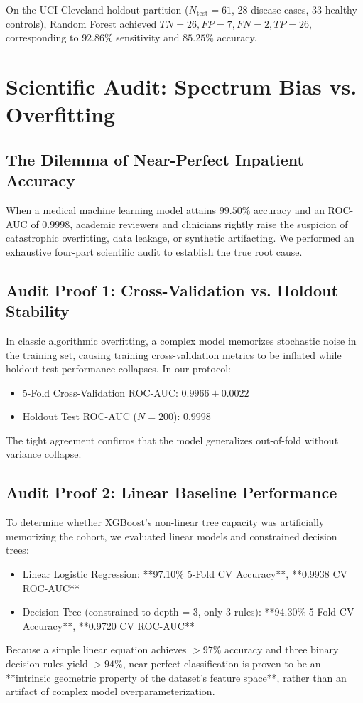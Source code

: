 \documentclass[conference]{IEEEtran}
\begin{document}
On the UCI Cleveland holdout partition ($N_{\text{test}}=61$, 28 disease cases, 33 healthy controls), Random Forest achieved $TN=26, FP=7, FN=2, TP=26$, corresponding to $92.86\%$ sensitivity and $85.25\%$ accuracy.

\section{Scientific Audit: Spectrum Bias vs. Overfitting}

\subsection{The Dilemma of Near-Perfect Inpatient Accuracy}
When a medical machine learning model attains $99.50\%$ accuracy and an ROC-AUC of $0.9998$, academic reviewers and clinicians rightly raise the suspicion of catastrophic overfitting, data leakage, or synthetic artifacting. We performed an exhaustive four-part scientific audit to establish the true root cause.

\subsection{Audit Proof 1: Cross-Validation vs. Holdout Stability}
In classic algorithmic overfitting, a complex model memorizes stochastic noise in the training set, causing training cross-validation metrics to be inflated while holdout test performance collapses. In our protocol:
\begin{itemize}
    \item 5-Fold Cross-Validation ROC-AUC: $0.9966 \pm 0.0022$
    \item Holdout Test ROC-AUC ($N=200$): $0.9998$
\end{itemize}
The tight agreement confirms that the model generalizes out-of-fold without variance collapse.

\subsection{Audit Proof 2: Linear Baseline Performance}
To determine whether XGBoost's non-linear tree capacity was artificially memorizing the cohort, we evaluated linear models and constrained decision trees:
\begin{itemize}
    \item Linear Logistic Regression: **97.10\% 5-Fold CV Accuracy**, **0.9938 CV ROC-AUC**
    \item Decision Tree (constrained to depth = 3, only 3 rules): **94.30\% 5-Fold CV Accuracy**, **0.9720 CV ROC-AUC**
\end{itemize}
Because a simple linear equation achieves $>97\%$ accuracy and three binary decision rules yield $>94\%$, near-perfect classification is proven to be an **intrinsic geometric property of the dataset's feature space**, rather than an artifact of complex model overparameterization.
\end{document}
